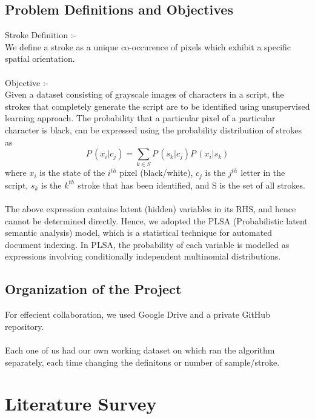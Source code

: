 \documentclass[10pt]{article}
\begin{document}
		\subsection{Problem Definitions and Objectives}
			Stroke Definition :-\\We define a stroke as a unique co-occurence of pixels which exhibit a specific spatial orientation.\\\\ 
			Objective :-\\Given a dataset consisting of grayscale images of characters in a script, the strokes that completely generate the script are to be identified using unsupervised learning approach.
			The probability that a particular pixel of a particular character is black, can be expressed using the probability distribution of strokes as\\
			\begin{equation}
			P\,(x_i|c_j)=\sum_{k\in S} P\,(s_k|c_j)P\,(x_i|s_k)
			\end{equation}
			where $x_{i}$ is the state of the $i^{th}$ pixel (black/white), $c_{j}$ is the $j^{th}$ letter in the script, $s_{k}$ is the $k^{th}$ stroke that has been identified, and S is the set of all strokes.\\\\
			The above expression contains latent (hidden) variables in its RHS, and hence cannot be determined directly. Hence, we adopted the PLSA (Probabilistic latent semantic analysis) model, which is a statistical technique for automated document indexing. In PLSA, the probability of each variable is modelled as expressions involving conditionally independent multinomial distributions.
		\subsection{Organization of the Project}  
		    For effecient collaboration, we used Google Drive and a private GitHub repository.\\\\
		    Each one of us had our own working dataset on which ran the algorithm separately, each time changing the definitons or number of sample/stroke. 
	\newpage
	\section{Literature Survey}
\end{document}

